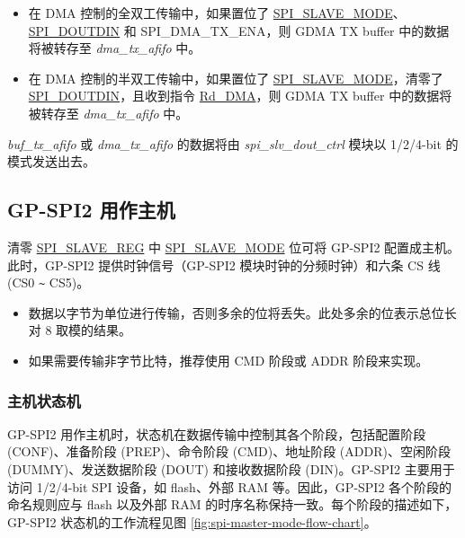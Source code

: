 \documentclass[main\_\_CN.tex]{subfiles}
\begin{document}
\begin{itemize}
\begin{itemize}
        \item 在 DMA 控制的全双工传输中，如果置位了 \hyperref[fielddesc:SPISLAVEMODE]{SPI\_SLAVE\_MODE}、\hyperref[fielddesc:SPIDOUTDIN]{SPI\_DOUTDIN} 和 SPI\_DMA\_TX\_ENA，则 GDMA TX buffer 中的数据将被转存至 \emph{dma\_tx\_afifo} 中。       
        
        \item 在 DMA 控制的半双工传输中，如果置位了 \hyperref[fielddesc:SPISLAVEMODE]{SPI\_SLAVE\_MODE}，清零了 \hyperref[fielddesc:SPIDOUTDIN]{SPI\_DOUTDIN}，且收到指令 \hyperref[cmd:rddma]{Rd\_DMA}，则 GDMA TX buffer 中的数据将被转存至 \emph{dma\_tx\_afifo} 中。
        
    \end{itemize}
    
\emph{buf\_tx\_afifo} 或 \emph{dma\_tx\_afifo} 的数据将由 \emph{spi\_slv\_dout\_ctrl} 模块以 1/2/4-bit 的模式发送出去。
\end{itemize}

\subsection{GP-SPI2 用作主机}\label{sec:gp-spi2-master-mode}
清零 \hyperref[regdesc:SPISLAVEREG]{SPI\_SLAVE\_REG} 中 \hyperref[fielddesc:SPISLAVEMODE]{SPI\_SLAVE\_MODE} 位可将 GP-SPI2 配置成主机。此时，GP-SPI2 提供时钟信号（GP-SPI2 模块时钟的分频时钟）和六条 CS 线 (CS0 \verb+~+ CS5)。

\begin{tiplisting}
\vspace{-2em}
\begin{itemize}
    \item 数据以字节为单位进行传输，否则多余的位将丢失。此处多余的位表示总位长对 8 取模的结果。 
    \item 如果需要传输非字节比特，推荐使用 CMD 阶段或 ADDR 阶段来实现。
\end{itemize}
\end{tiplisting}

 
\subsubsection{主机状态机}
\label{sec:gp-spi2-state-machine}

GP-SPI2 用作主机时，状态机在数据传输中控制其各个阶段，包括配置阶段 (CONF)、准备阶段 (PREP)、命令阶段 (CMD)、地址阶段 (ADDR)、空闲阶段 (DUMMY)、发送数据阶段 (DOUT) 和接收数据阶段 (DIN)。GP-SPI2 主要用于访问 1/2/4-bit SPI 设备，如 flash、外部 RAM 等。因此，GP-SPI2 各个阶段的命名规则应与 flash 以及外部 RAM 的时序名称保持一致。每个阶段的描述如下，GP-SPI2 状态机的工作流程见图  \ref{fig:spi-master-mode-flow-chart}。
\end{document}
